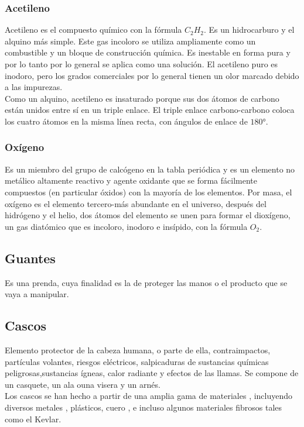 \documentclass[12pt,graphicx,caption,rotating]{article}
\begin{document}
\subsubsection{Acetileno}
\noindent
Acetileno es el compuesto químico con la fórmula $C_{2}H_{2}$. Es un hidrocarburo y el alquino más simple. Este gas incoloro se utiliza ampliamente como un combustible y un bloque de construcción química. Es inestable en forma pura y por lo tanto por lo general se aplica como una solución. El acetileno puro es inodoro, pero los grados comerciales por lo general tienen un olor marcado debido a las impurezas.\\
Como un alquino, acetileno es insaturado porque sus dos átomos de carbono están unidos entre sí en un triple enlace. El triple enlace carbono-carbono coloca los cuatro átomos en la misma línea recta, con ángulos de enlace de $180°$.\cite{page6}

\subsubsection{Oxígeno}
\noindent
Es un miembro del grupo de calcógeno en la tabla periódica y es un elemento no metálico altamente reactivo y agente oxidante que se forma fácilmente compuestos (en particular óxidos) con la mayoría de los elementos. Por masa, el oxígeno es el elemento tercero-más abundante en el universo, después del hidrógeno y el helio, dos átomos del elemento se unen para formar el dioxígeno, un gas diatómico que es incoloro, inodoro e insípido, con la fórmula $O_2$.\cite{page7}

\subsection{Guantes}
\noindent
Es una prenda, cuya finalidad es la de proteger las manos o el producto que se vaya a manipular.\cite{ntc}

\subsection{Cascos}
\noindent
Elemento protector de la cabeza humana, o parte de ella, contraimpactos, partículas volantes, riesgos eléctricos, salpicaduras de sustancias químicas peligrosas,sustancias ígneas, calor radiante y efectos de las llamas. Se compone de un casquete, un ala ouna visera y un arnés.\cite{ntc1523}\\
Los cascos se han hecho a partir de una amplia gama de materiales , incluyendo diversos metales , plásticos, cuero , e incluso algunos materiales fibrosos tales como el Kevlar.
\end{document}
